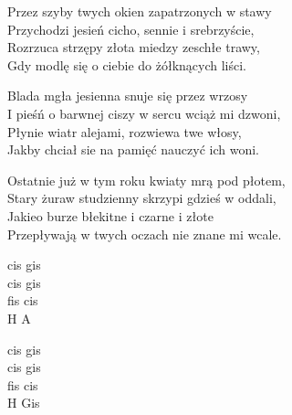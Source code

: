 \begin{text}
    Przez szyby twych okien zapatrzonych w stawy\\
    Przychodzi jesień cicho, sennie i srebrzyście,\\
    Rozrzuca strzępy złota miedzy zeschłe trawy,\\
    Gdy modlę się o ciebie do żółknących liści.

    Blada mgła jesienna snuje się przez wrzosy\\
    I pieśń o barwnej ciszy w sercu wciąż mi dzwoni,\\
    Płynie wiatr alejami, rozwiewa twe włosy,\\
    Jakby chciał sie na pamięć nauczyć ich woni.

    Ostatnie już w tym roku kwiaty mrą pod płotem,\\
    Stary żuraw studzienny skrzypi gdzieś w oddali,\\
    Jakieo burze błekitne i czarne i złote\\
    Przepływają w twych oczach nie znane mi wcale.
\end{text}
\begin{chord}
    cis gis\\
    cis gis\\
    fis cis\\
    H A

    cis gis\\
    cis gis\\
    fis cis\\
    H Gis
\end{chord}